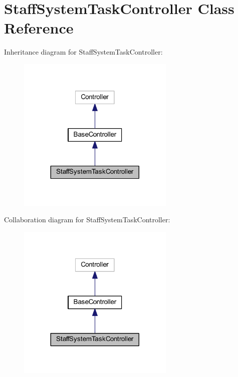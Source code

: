 \hypertarget{class_staff_system_task_controller}{}\section{Staff\+System\+Task\+Controller Class Reference}
\label{class_staff_system_task_controller}


Inheritance diagram for Staff\+System\+Task\+Controller\+:
\nopagebreak
\begin{figure}[H]
\begin{center}
\leavevmode
\includegraphics[width=212pt]{class_staff_system_task_controller__inherit__graph}
\end{center}
\end{figure}


Collaboration diagram for Staff\+System\+Task\+Controller\+:
\nopagebreak
\begin{figure}[H]
\begin{center}
\leavevmode
\includegraphics[width=212pt]{class_staff_system_task_controller__coll__graph}
\end{center}
\end{figure}
